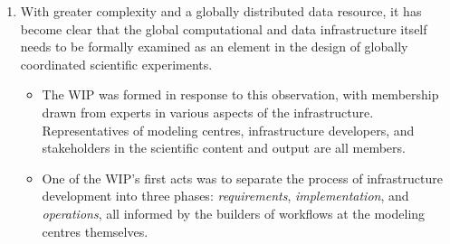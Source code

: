 \documentclass[gmd,manuscript]{copernicus}
\begin{document}
\begin{enumerate}
\item With greater complexity and a globally distributed data
  resource, it has become clear that the global computational and data
  infrastructure itself needs to be formally examined as an element in
  the design of globally coordinated scientific experiments.

  
  \begin{itemize}
  \item The WIP was formed in response to this observation, with
    membership drawn from experts in various aspects of the
    infrastructure. Representatives of modeling centres,
    infrastructure developers, and stakeholders in the scientific
    content and output are all members.
  \item One of the WIP's first acts was to separate the process of
    infrastructure development into three phases: \emph{requirements},
    \emph{implementation}, and \emph{operations}, all informed by the
    builders of workflows at the modeling centres themselves.
    

\end{itemize}
\end{enumerate}
\end{document}
